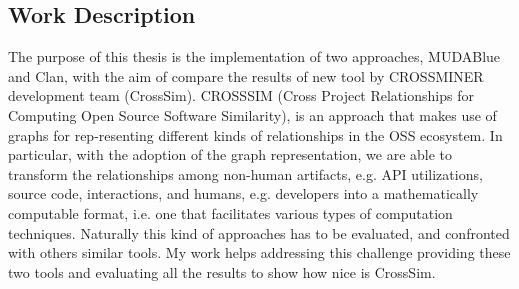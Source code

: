 \subsection{Work Description}
The purpose of this thesis is the implementation of two approaches, MUDABlue and Clan, with the aim of compare the results of new tool by CROSSMINER development team (CrossSim). CROSSSIM (Cross Project Relationships for Computing Open Source Software Similarity), is an approach that makes use of graphs for rep-resenting different kinds of relationships in the OSS ecosystem. In particular, with the adoption of the graph representation, we are able to transform the relationships among non-human artifacts, e.g. API utilizations, source code, interactions, and humans, e.g. developers into a mathematically computable format, i.e. one that
facilitates various types of computation techniques. Naturally this kind of approaches has to be evaluated, and confronted with others similar tools. My work helps addressing this challenge providing these two tools and evaluating all the results to show how nice is CrossSim.